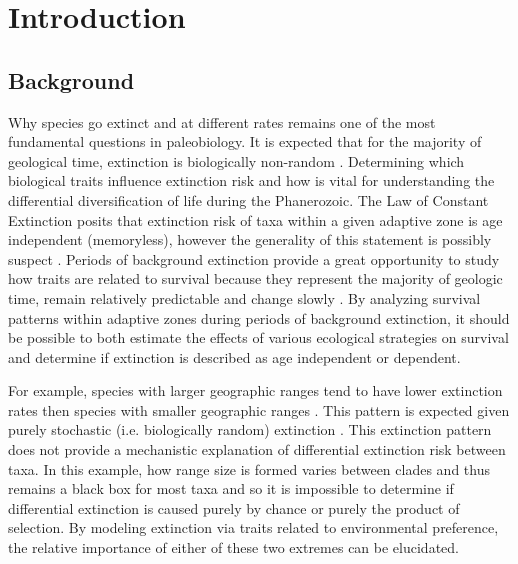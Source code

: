 \documentclass[11pt,letterpaper]{article}
\begin{document}
\section{Introduction}
\subsection{Background}
Why species go extinct and at different rates remains one of the most fundamental questions in paleobiology. It is expected that for the majority of geological time, extinction is biologically non-random \citep{Jablonski1986,Alexander1977,Harnik2011,Johnson2002b,Kitchell1986,Nurnberg2013a,Payne2007}. Determining which biological traits influence extinction risk and how is vital for understanding the differential diversification of life during the Phanerozoic. The Law of Constant Extinction \citep{VanValen1973} posits that extinction risk of taxa within a given adaptive zone is age independent (memoryless), however the generality of this statement is possibly suspect \citep{Drake2014,Raup1975,Sepkoski1975,Finnegan2008}. Periods of background extinction provide a great opportunity to study how traits are related to survival because they represent the majority of geologic time, remain relatively predictable and change slowly \citep{Jablonski1986,Raup1988}. By analyzing survival patterns within adaptive zones during periods of background extinction, it should be possible to both estimate the effects of various ecological strategies on survival and determine if extinction is described as age independent or dependent.

For example, species with larger geographic ranges tend to have lower extinction rates then species with smaller geographic ranges \citep{Jablonski1986,Harnik2013,Nurnberg2013a,Jablonski2003,Roy2009c}. This pattern is expected given purely stochastic (i.e. biologically random) extinction \citep{Raup1991b}. This extinction pattern does not provide a mechanistic explanation of differential extinction risk between taxa. In this example, how range size is formed varies between clades and thus remains a black box for most taxa \citep{Jablonski1987} and so it is impossible to determine if differential extinction is caused purely by chance or purely the product of selection. By modeling extinction via traits related to environmental preference, the relative importance of either of these two extremes can be elucidated.
\end{document}
